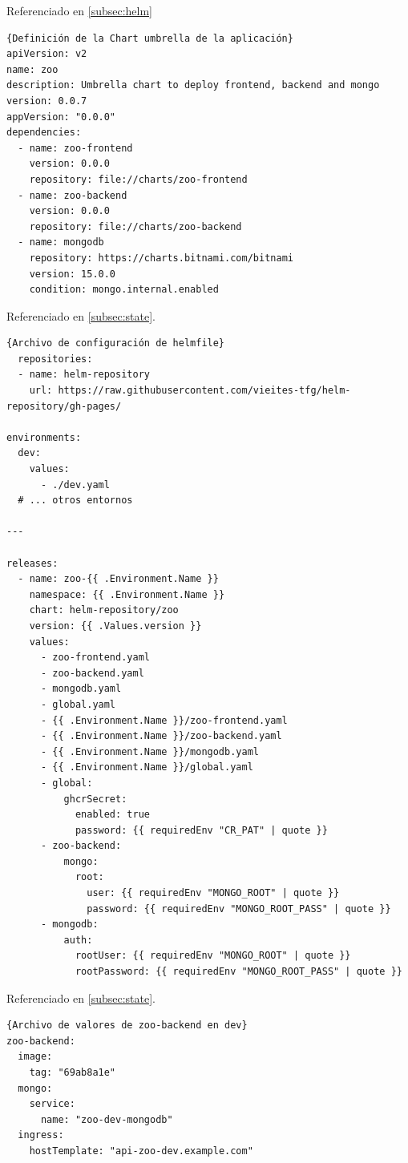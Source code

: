 Referenciado en \ref{subsec:helm}

\begin{lstlisting}[language=helm,label=lst:umbrella]{Definición de la Chart umbrella de la aplicación}
apiVersion: v2
name: zoo
description: Umbrella chart to deploy frontend, backend and mongo
version: 0.0.7
appVersion: "0.0.0"
dependencies:
  - name: zoo-frontend
    version: 0.0.0
    repository: file://charts/zoo-frontend
  - name: zoo-backend
    version: 0.0.0
    repository: file://charts/zoo-backend
  - name: mongodb
    repository: https://charts.bitnami.com/bitnami
    version: 15.0.0
    condition: mongo.internal.enabled
\end{lstlisting}

Referenciado en \ref{subsec:state}.

\begin{lstlisting}[language=helmfile,label=lst:helmfile]{Archivo de configuración de helmfile}
  repositories:
  - name: helm-repository
    url: https://raw.githubusercontent.com/vieites-tfg/helm-repository/gh-pages/

environments:
  dev:
    values:
      - ./dev.yaml
  # ... otros entornos

---

releases:
  - name: zoo-{{ .Environment.Name }}
    namespace: {{ .Environment.Name }}
    chart: helm-repository/zoo
    version: {{ .Values.version }}
    values:
      - zoo-frontend.yaml
      - zoo-backend.yaml
      - mongodb.yaml
      - global.yaml
      - {{ .Environment.Name }}/zoo-frontend.yaml
      - {{ .Environment.Name }}/zoo-backend.yaml
      - {{ .Environment.Name }}/mongodb.yaml
      - {{ .Environment.Name }}/global.yaml
      - global:
          ghcrSecret:
            enabled: true
            password: {{ requiredEnv "CR_PAT" | quote }}
      - zoo-backend:
          mongo:
            root:
              user: {{ requiredEnv "MONGO_ROOT" | quote }}
              password: {{ requiredEnv "MONGO_ROOT_PASS" | quote }}
      - mongodb:
          auth:
            rootUser: {{ requiredEnv "MONGO_ROOT" | quote }}
            rootPassword: {{ requiredEnv "MONGO_ROOT_PASS" | quote }}
\end{lstlisting}

Referenciado en \ref{subsec:state}.

\begin{lstlisting}[label=lst:values]{Archivo de valores de zoo-backend en dev}
zoo-backend:
  image:
    tag: "69ab8a1e"
  mongo:
    service:
      name: "zoo-dev-mongodb"
  ingress:
    hostTemplate: "api-zoo-dev.example.com"
\end{lstlisting}


